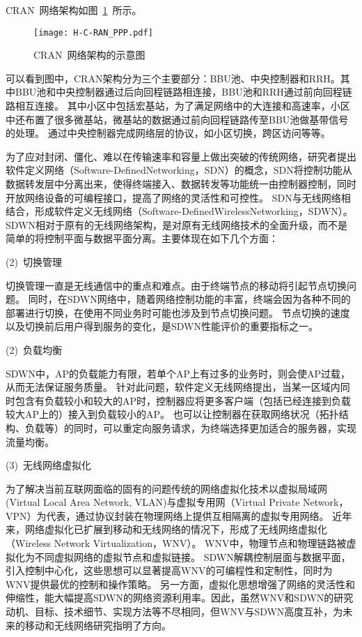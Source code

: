 CRAN~网络架构如图~\ref{CRAN}~所示。
\begin{figure}[htbp]
\centering
\texttt{[image: H-C-RAN\_PPP.pdf]}
\caption{CRAN~网络架构的示意图}\vspace{-1.5em}
\label{CRAN}
\end{figure}

可以看到图中，CRAN架构分为三个主要部分：BBU池、中央控制器和RRH。其中BBU池和中央控制器通过后向回程链路相连接，BBU池和RRH通过前向回程链路相互连接。
其中小区中包括宏基站，为了满足网络中的大连接和高速率，小区中还布置了很多微基站，微基站的数据通过前向回程链路传至BBU池做基带信号的处理。
通过中央控制器完成网络层的协议，如小区切换，跨区访问等等。


为了应对封闭、僵化、难以在传输速率和容量上做出突破的传统网络，研究者提出软件定义网络（Software-DefinedNetworking，SDN）的概念，SDN将控制功能从数据转发层中分离出来，使得终端接入、数据转发等功能统一由控制器控制，同时开放网络设备的可编程接口，提高了网络的灵活性和可控性。
SDN与无线网络相结合，形成软件定义无线网络（Software-DefinedWirelessNetworking，SDWN）。
SDWN相对于原有的无线网络架构，是对原有无线网络技术的全面升级，而不是简单的将控制平面与数据平面分离。主要体现在如下几个方面：

(2)~切换管理

切换管理一直是无线通信中的重点和难点。由于终端节点的移动将引起节点切换问题。
同时，在SDWN网络中，随着网络控制功能的丰富，终端会因为各种不同的部署进行切换，在使用不同业务时可能也涉及到节点切换问题。
节点切换的速度以及切换前后用户得到服务的变化，是SDWN性能评价的重要指标之一。

(2)~负载均衡

SDWN中，AP的负载能力有限，若单个AP上有过多的业务时，则会使AP过载，从而无法保证服务质量。
针对此问题，软件定义无线网络提出，当某一区域内同时包含有负载较小和较大的AP时，控制器应将更多客户端（包括已经连接到负载较大AP上的）接入到负载较小的AP。
也可以让控制器在获取网络状况（拓扑结构、负载等）的同时，可以重定向服务请求，为终端选择更加适合的服务器，实现流量均衡。

(3)~无线网络虚拟化

为了解决当前互联网面临的固有的问题传统的网络虚拟化技术以虚拟局域网(Virtual Local Area Network, VLAN)与虚拟专用网（Virtual Private Network，VPN）为代表，通过协议封装在物理网络上提供互相隔离的虚拟专用网络。
近年来，网络虚拟化已扩展到移动和无线网络的情况下，形成了无线网络虚拟化（Wireless Network Virtualization，WNV）。
WNV中，物理节点和物理链路被虚拟化为不同虚拟网络的虚拟节点和虚拟链接。
SDWN解耦控制层面与数据平面，引入控制中心化，这些思想可以显著提高WNV的可编程性和定制性，同时为WNV提供最优的控制和操作策略。
另一方面，虚拟化思想增强了网络的灵活性和伸缩性，能大幅提高SDWN的网络资源利用率。因此，虽然WNV和SDWN的研究动机、目标、技术细节、实现方法等不尽相同，但WNV与SDWN高度互补，为未来的移动和无线网络研究指明了方向。

